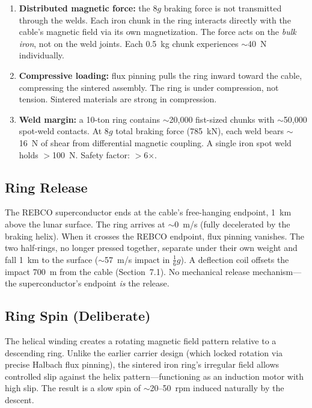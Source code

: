 \documentclass[12pt,letterpaper]{article}
\begin{document}
\begin{enumerate}[label=(\roman*)]
\item \textbf{Distributed magnetic force:} the 8$g$ braking force is not transmitted through the welds. Each iron chunk in the ring interacts directly with the cable's magnetic field via its own magnetization. The force acts on the \emph{bulk iron}, not on the weld joints. Each 0.5~kg chunk experiences ${\sim}$40~N individually.
\item \textbf{Compressive loading:} flux pinning pulls the ring inward toward the cable, compressing the sintered assembly. The ring is under compression, not tension. Sintered materials are strong in compression.
\item \textbf{Weld margin:} a 10-ton ring contains ${\sim}$20{,}000 fist-sized chunks with ${\sim}$50{,}000 spot-weld contacts. At 8$g$ total braking force (785~kN), each weld bears ${\sim}$16~N of shear from differential magnetic coupling. A single iron spot weld holds $>$100~N. Safety factor: $>$6$\times$.
\end{enumerate}

\subsection{Ring Release}

The REBCO superconductor ends at the cable's free-hanging endpoint, 1~km above the lunar surface. The ring arrives at ${\sim}$0~m/s (fully decelerated by the braking helix). When it crosses the REBCO endpoint, flux pinning vanishes. The two half-rings, no longer pressed together, separate under their own weight and fall 1~km to the surface (${\sim}$57~m/s impact in $\frac{1}{6}g$). A deflection coil offsets the impact 700~m from the cable (Section~7.1). No mechanical release mechanism---the superconductor's endpoint \emph{is} the release.

\subsection{Ring Spin (Deliberate)}

The helical winding creates a rotating magnetic field pattern relative to a descending ring. Unlike the earlier carrier design (which locked rotation via precise Halbach flux pinning), the sintered iron ring's irregular field allows controlled slip against the helix pattern---functioning as an induction motor with high slip. The result is a slow spin of ${\sim}$20--50~rpm induced naturally by the descent.
\end{document}
